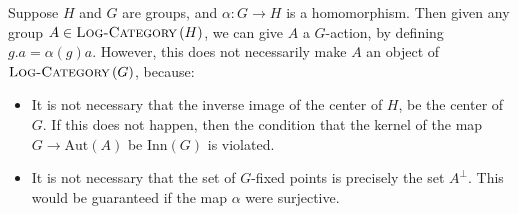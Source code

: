 \documentclass[a4paper]{amsart}
\newcommand{\logcategory}[1]{\textsc{Log-Category}\left(#1\right)}
\newcommand{\aut}[1]{\text{Aut}\left(#1\right)}
\newcommand{\inn}[1]{\text{Inn}\left(#1\right)}
\begin{document}
Suppose $H$ and $G$ are groups, and $\alpha:G \to H$ is a
homomorphism. Then given any group $A \in \logcategory{H}$, we can
give $A$ a $G$-action, by defining $g.a = \alpha(g)a$. However, this
does not necessarily make $A$ an object of $\logcategory{G}$, because:

\begin{itemize}
\item It is not necessary that the inverse image of the center of $H$,
  be the center of $G$. If this does not happen, then the condition
  that the kernel of the map $G \to \aut{A}$ be $\inn{G}$ is violated.
\item It is not necessary that the set of $G$-fixed points is
  precisely the set $A^\perp$. This would be guaranteed if the map
  $\alpha$ were surjective.
\end{itemize}


\printindex
\end{document}
